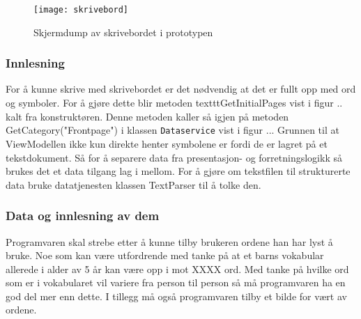 {\begin{figure}[ht!] 
\centering 
\texttt{[image: skrivebord]} 
\caption{Skjermdump av skrivebordet i prototypen} 
\label{fig:skrivebord} 
\end{figure} 
 

\subsubsection{Innlesning}


For å kunne skrive med skrivebordet er det nødvendig at det er fullt opp med ord og symboler. For å gjøre dette blir metoden texttt{GetInitialPages} vist i figur .. kalt fra konstruktøren. Denne metoden kaller så igjen på metoden GetCategory("Frontpage") i klassen \texttt{Dataservice} vist i figur ... Grunnen til at ViewModellen ikke kun direkte henter symbolene er fordi de er lagret på et tekstdokument. Så for å separere data fra presentasjon- og forretningslogikk så brukes det et data tilgang lag i mellom. For å gjøre om tekstfilen til strukturerte data bruke datatjenesten klassen TextParser til å tolke den. 


\subsubsection{Data og innlesning av dem}

Programvaren skal strebe etter å kunne tilby brukeren ordene han har lyst å bruke. Noe som kan være utfordrende med tanke på at et barns vokabular allerede i alder av 5 år kan være opp i mot XXXX ord. Med tanke på hvilke ord som er i vokabularet vil variere  fra person til person så må programvaren ha en god del mer enn dette. I tillegg må også programvaren tilby et bilde for vært av ordene. 

}
